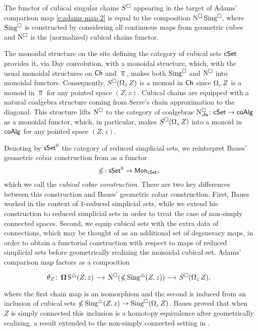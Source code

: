 The functor of cubical singular chains $S^\square$ appearing in the target of Adams' comparison map \eqref{e:adams map 2} is equal to the composition $\operatorname{N^{\square}} \operatorname{Sing^{\square}}$, where $\operatorname{Sing^{\square}}$ is constructed by considering all continuous maps from geometric cubes and $\operatorname{N^{\square}}$ is the (normalized) cubical chains functor. 

The monoidal structure on the site defining the category of cubical sets $\mathsf{cSet}$ provides it, via Day convolution, with a monoidal structure, which, with the usual monoidal structures on $\mathsf{Ch}$ and $\Top$, makes both $\operatorname{Sing^{\square}}$ and $\operatorname{N^{\square}}$ into monoidal functors.
Consequently, $S^\square(\operatorname{\Omega}_z Z)$ is a monoid in $\mathsf{Ch}$ since $\operatorname{\Omega}_z Z$ is a monoid in $\Top$ for any pointed space $(Z, z)$.
Cubical chains are equipped with a natural coalgebra structure coming from Serre's chain approximation to the diagonal.
This structure lifts $\operatorname{N^{\square}}$ to the category of coalgebras $\operatorname{N^{\square}_{{\mathcal{A}\mathsf{s}}}} \colon \mathsf{cSet} \to \mathsf{coAlg}$ as a monoidal functor, which, in particular, makes $S^\square(\operatorname{\Omega}_z Z)$ into a monoid in $\mathsf{coAlg}$ for any pointed space $(Z, z)$.

Denoting by $\mathsf{sSet}^0$ the category of reduced simplicial sets, we reinterpret Baues' geometric cobar construction from \cite{baues1998hopf} as a functor
\[
\operatorname{\mathbb{\Omega}} \colon \mathsf{sSet}^0 \to \mathsf{Mon}_{\mathsf{cSet}},
\]
which we call the \textit{cubical cobar construction}. There are two key differences between this construction and Baues' geometric cobar construction. First, Baues worked in the context of $1$-reduced simplicial sets, while we extend his construction to reduced simplicial sets in order to treat the case of non-simply connected spaces. Second, we equip cubical sets with the extra data of connections, which may be thought of as an additional set of degeneracy maps, in order to obtain a functorial construction with respect to maps of reduced simplicial sets before geometrically realizing the monoidal cubical set. Adams' comparison map factors as a composition
\begin{equation} \label{e:baues factorization of adams map}
\begin{tikzcd}[column sep = small]
\theta_Z \colon \cobar \sS(Z, z) \arrow[r] &
\cchains(\ccobar \sSing(Z, z)) \arrow[r] &
S^{\cube}(\loops_z Z),
\end{tikzcd}
\end{equation}
where the first chain map is an isomorphism and the second is induced from an inclusion of cubical sets $\operatorname{\mathbb{\Omega}} \operatorname{Sing^{\triangle}}(Z, z) \to \operatorname{Sing^{\square}}(\operatorname{\Omega}_z Z)$.
Baues proved that when $Z$ is simply connected this inclusion is a homotopy equivalence after geometrically realizing, a result extended to the non-simply connected setting in \cite{rivera2019path}. 

